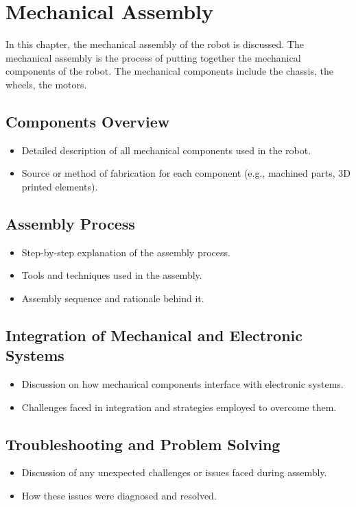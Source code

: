 \chapter{Mechanical Assembly}

\graphicspath{{./Figures/Modeling}}

In this chapter, the mechanical assembly of the robot is discussed. The mechanical assembly is the process of putting together the mechanical components of the robot. The mechanical components include the chassis, the wheels, the motors.
\newpage

\section{Components Overview}
\begin{itemize}
\item Detailed description of all mechanical components used in the robot.
\item Source or method of fabrication for each component (e.g., machined parts, 3D printed elements).
\end{itemize}
\section{Assembly Process}
\begin{itemize}
\item Step-by-step explanation of the assembly process.
\item Tools and techniques used in the assembly.
\item Assembly sequence and rationale behind it.
\end{itemize}
\section{Integration of Mechanical and Electronic Systems}
\begin{itemize}
\item Discussion on how mechanical components interface with electronic systems.
\item Challenges faced in integration and strategies employed to overcome them.
\end{itemize}
\section{Troubleshooting and Problem Solving}
\begin{itemize}
\item Discussion of any unexpected challenges or issues faced during assembly.
\item How these issues were diagnosed and resolved.
\end{itemize}
